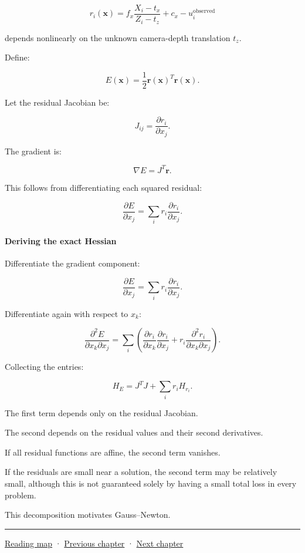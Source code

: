 \[
r_i(\mathbf x) = f_x\frac{X_i-t_x}{Z_i-t_z}+c_x-u_i^{\mathrm{observed}}
\]

depends nonlinearly on the unknown camera-depth translation \(t_z\).

Define:

\[
E(\mathbf x)=\frac12\mathbf r(\mathbf x)^T\mathbf r(\mathbf x).
\]

Let the residual Jacobian be:

\[
J_{ij}= \frac{\partial r_i}{\partial x_j}.
\]

The gradient is:

\[
\boxed{ \nabla E=J^T\mathbf r }.
\]

This follows from differentiating each squared residual:

\[
\frac{\partial E}{\partial x_j} = \sum_i r_i\frac{\partial r_i}{\partial x_j}.
\]

\paragraph{Deriving the exact Hessian}\label{02-foundations-ii-ch026-deriving-the-exact-hessian}

Differentiate the gradient component:

\[
\frac{\partial E}{\partial x_j} = \sum_i r_i\frac{\partial r_i}{\partial x_j}.
\]

Differentiate again with respect to \(x_k\):

\[
\frac{\partial^2E}{\partial x_k\partial x_j} = \sum_i \left( \frac{\partial r_i}{\partial x_k} \frac{\partial r_i}{\partial x_j} + r_i\frac{\partial^2r_i}{\partial x_k\partial x_j} \right).
\]

Collecting the entries:

\[
\boxed{ H_E = J^TJ+ \sum_i r_iH_{r_i} }.
\]

The first term depends only on the residual Jacobian.

The second depends on the residual values and their second derivatives.

If all residual functions are affine, the second term vanishes.

If the residuals are small near a solution, the second term may be relatively small, although this is not guaranteed solely by having a small total loss in every problem.

This decomposition motivates Gauss--Newton.

\begin{center}\rule{0.5\linewidth}{0.5pt}\end{center}

\hyperref[volume-reading-map]{Reading map} · \hyperref[02-foundations-ii-ch025-continuous-models-and-numerical-error]{Previous chapter} · \hyperref[02-foundations-ii-ch027-gaussnewton-for-geometry-and-pose]{Next chapter}
